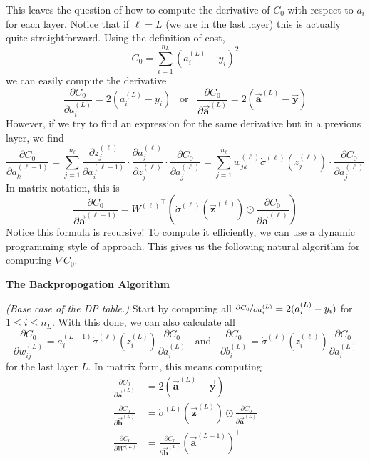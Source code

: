 \documentclass[12pt, letterpaper]{article}
\theoremstyle{definition}
\theoremstyle{remark}
\newcommand{\vect}[1]{\vec{\mathbf{#1}}}
\begin{document}
This leaves the question of how to compute the derivative of $C_0$ with respect to $a_i$ for each layer. Notice that if $\ell = L$ (we 
are in the last layer) this is actually quite straightforward. Using the definition of cost,
\[
    C_0 = \sum_{i = 1}^{n_L} (a_i^{(L)} - y_i)^2
\]
we can easily compute the derivative
\[
    \frac{\partial C_0}{\partial a_i^{(L)}} = 2(a_i^{(L)} - y_i) \;\;\; \text{or} \;\;\; \frac{\partial C_0}{\partial \vect{a}^{(L)}} = 2(\vect{a}^{(L)} - \vect{y})
\]
However, if we try to find an expression for the same derivative but in a previous layer, we find 
\[
    \frac{\partial C_0}{\partial a_k^{(\ell - 1)}} = \sum_{j = 1}^{n_\ell} \frac{\partial z_j^{(\ell)}}{\partial a_i^{(\ell - 1)}} \cdot 
                                                                             \frac{\partial a_j^{(\ell)}}{\partial z_j^{(\ell)}} \cdot 
                                                                             \frac{\partial C_0}{\partial a_j^{(\ell)}}
                                                   = \sum_{j = 1}^{n_\ell}  w_{jk}^{(\ell)} \dot\sigma^{(\ell)}(z_j^{(\ell)}) \cdot \frac{\partial C_0}{\partial a_j^{(\ell)}}
\]
In matrix notation, this is 
\[
    \frac{\partial C_0}{\partial \vect{a}^{(\ell - 1)}} = {W^{(\ell)}}^\top \left(\dot\sigma^{(\ell)}\left(\vect{z}^{(\ell)}\right) \odot \frac{\partial C_0}{\partial \vect{a}^{(\ell)}}\right)
\]
Notice this formula is recursive! To compute it efficiently, we can use a dynamic programming style of approach. This 
gives us the following natural algorithm for computing $\nabla C_0$.

\begin{center}
    \textbf{The Backpropogation Algorithm}
\end{center}

\emph{(Base case of the DP table.)} Start by computing all $\nicefrac{\partial C_0}{\partial a_i^{(L)}} = 2(a_i^{(L)} - y_i)$ for $1 \leq i \leq n_L$.
With this done, we can also calculate all 
\[
    \frac{\partial C_0}{\partial w_{ij}^{(L)}} = a_i^{(L - 1)} \dot\sigma^{(\ell)}(z_i^{(L)}) \frac{\partial C_0}{\partial a_i^{(L)}} \;\;\; \text{and} \;\;\; \frac{\partial C_0}{\partial b_i^{(L)}} = \dot\sigma^{(\ell)}(z_i^{(\ell)}) \frac{\partial C_0}{\partial a_i^{(L)}}
\]
for the last layer $L$. In matrix form, this means computing 
\begin{align*}
    \frac{\partial C_0}{\partial \vect{a}^{(L)}} &= 2\left(\vect{a}^{(L)} - \vect y\right) \\
    \frac{\partial C_0}{\partial \vect{b}^{(L)}} &= \dot\sigma^{(L)}(\vect{z}^{(L)}) \odot \frac{\partial C_0}{\partial \vect{a}^{(L)}} \\
    \frac{\partial C_0}{\partial W^{(L)}}        &= \frac{\partial C_0}{\partial \vect{b}^{(L)}} \left(\vect{a}^{(L - 1)}\right)^\top
\end{align*}
\end{document}
